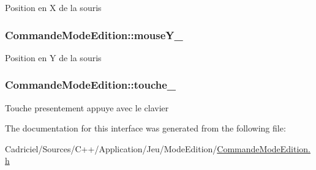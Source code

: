 Position en X de la souris \hypertarget{class_commande_mode_edition_a6128370123ce4b6e6fb8571c953241e4}{
\subsubsection[{mouse\-Y\-\_\-}]{ Commande\-Mode\-Edition\-::mouse\-Y\-\_\-\hspace{0.3cm}{\ttfamily [protected]}}}\label{class_commande_mode_edition_a6128370123ce4b6e6fb8571c953241e4}
Position en Y de la souris \hypertarget{class_commande_mode_edition_a3a522c03034a54eb01178e8c8af9a8db}{
\subsubsection[{touche\-\_\-}]{ Commande\-Mode\-Edition\-::touche\-\_\-\hspace{0.3cm}{\ttfamily [protected]}}}\label{class_commande_mode_edition_a3a522c03034a54eb01178e8c8af9a8db}
Touche presentement appuye avec le clavier 

The documentation for this interface was generated from the following file\-:\begin{DoxyCompactItemize}
\item 
Cadriciel/\-Sources/\-C++/\-Application/\-Jeu/\-Mode\-Edition/\hyperlink{_commande_mode_edition_8h}{Commande\-Mode\-Edition.\-h}\end{DoxyCompactItemize}
